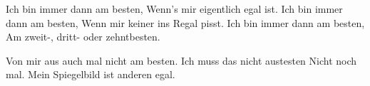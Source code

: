 \begin{guitar}
	\begin{highlightbar}
		Ich bin immer dann am besten,
		Wenn's mir eigentlich egal ist.
		Ich bin immer dann am besten,
		Wenn mir keiner ins Regal pisst.
		Ich bin immer dann am besten,
		Am zweit-, dritt- oder zehntbesten.
		
		Von mir aus auch mal nicht am besten.
		Ich muss das nicht austesten
		Nicht noch mal.
		Mein Spiegelbild ist anderen egal.
	\end{highlightbar}
\end{guitar}